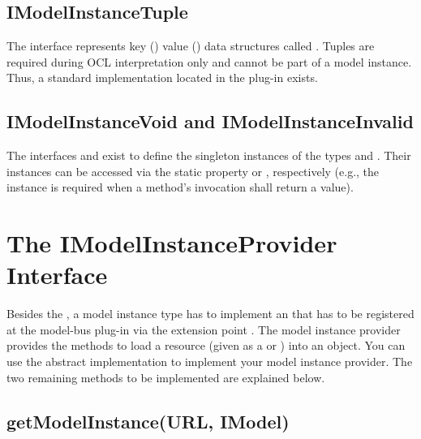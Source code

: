 \subsection{IModelInstanceTuple}

The interface  represents key
() value () data
structures called . Tuples are required during \acs{OCL} 
interpretation only and cannot be part of a model instance. Thus, a standard 
 implementation located in the plug-in 
 exists.


\subsection{IModelInstanceVoid and IModelInstanceInvalid}

The interfaces  and  exist 
to define the singleton instances of the types  and 
. Their instances can be accessed via the static property 
 or , 
respectively (e.g., the  instance is required when a 
method's invocation shall return a  value).



\section{The IModelInstanceProvider Interface}

Besides the , a model instance type has to 
implement an  that has to be registered at 
the model-bus plug-in via the extension point 
. The 
model instance provider provides the methods to load a resource (given as a 
 or ) into an  object. You can use the
abstract implementation  to implement your 
model instance provider. The two remaining methods to be implemented are 
explained below.


\subsection{getModelInstance(URL, IModel)}

